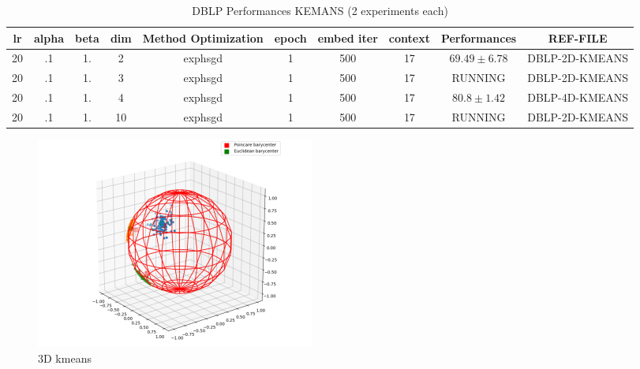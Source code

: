 \documentclass{article}
\begin{document}
\begin{table}
    \begin{tabular}{|ccccccccc|c|}
        \hline
        lr & alpha & beta & dim & Method Optimization& epoch & embed iter & context & Performances & REF-FILE\\
        \hline
        20 & .1 & 1.& 2 & exphsgd & 1 & 500 & 17 & $69.49 \pm 6.78$& DBLP-2D-KMEANS \\
        20 & .1 & 1.& 3 & exphsgd & 1 & 500 & 17 & RUNNING& DBLP-2D-KMEANS \\
        20 & .1 & 1.& 4 & exphsgd & 1 & 500 & 17 & $80.8 \pm 1.42$& DBLP-4D-KMEANS \\
        20 & .1 & 1.& 10 & exphsgd & 1 & 500 & 17 & RUNNING & DBLP-2D-KMEANS \\

        \hline
    \end{tabular}
\label{DBLP-RES}
\caption{DBLP Performances KEMANS (2 experiments each)}
\end{table}
\begin{figure}[!ht]
    \centering

        \includegraphics[scale=2]{media/kmeans3d.png}
        \caption{3D kmeans}

\end{figure}
\end{document}
